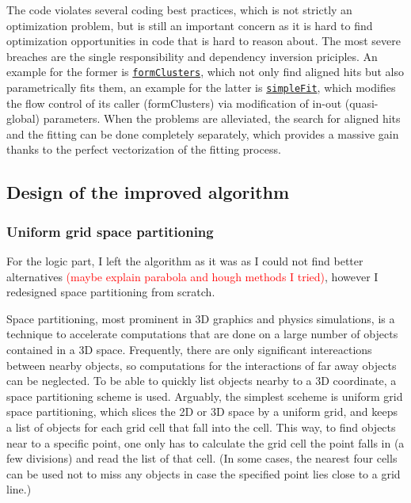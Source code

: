 \documentclass[12pt]{article}
\newcommand{\code}[1]{\texttt{#1}}
\begin{document}
The code violates several coding best practices, which is not strictly an optimization problem, but is still an important concern as it is hard to find optimization opportunities in code that is hard to reason about. The most severe breaches are the single responsibility and dependency inversion priciples. An example for the former is \href{https://gitlab.cern.ch/lhcb/Rec/blob/1b7edc5aea96f2225601238b3f64e478e41b6c70/Pr/PrVeloUT/src/PrVeloUT.cpp#L337}{\code{formClusters}}, which not only find aligned hits but also parametrically fits them, an example for the latter is \href{https://gitlab.cern.ch/lhcb/Rec/blob/1b7edc5aea96f2225601238b3f64e478e41b6c70/Pr/PrVeloUT/src/PrVeloUT.h#L191}{\code{simpleFit}}, which modifies the flow control of its caller (formClusters) via modification of in-out (quasi-global) parameters. When the problems are alleviated, the search for aligned hits and the fitting can be done completely separately, which provides a massive gain thanks to the perfect vectorization of the fitting process.


\subsection{Design of the improved algorithm}

\subsubsection{Uniform grid space partitioning}\label{sec_velout_space_partitioning}

For the logic part, I left the algorithm as it was as I could not find better alternatives \textcolor{red}{(maybe explain parabola and hough methods I tried)}, however I redesigned space partitioning from scratch.

Space partitioning, most prominent in 3D graphics and physics simulations, is a technique to accelerate computations that are done on a large number of objects contained in a 3D space. Frequently, there are only significant intereactions between nearby objects, so computations for the interactions of far away objects can be neglected. To be able to quickly list objects nearby to a 3D coordinate, a space partitioning scheme is used. Arguably, the simplest sceheme is uniform grid space partitioning, which slices the 2D or 3D space by a uniform grid, and keeps a list of objects for each grid cell that fall into the cell. This way, to find objects near to a specific point, one only has to calculate the grid cell the point falls in (a few divisions) and read the list of that cell. (In some cases, the nearest four cells can be used not to miss any objects in case the specified point lies close to a grid line.)
\end{document}
